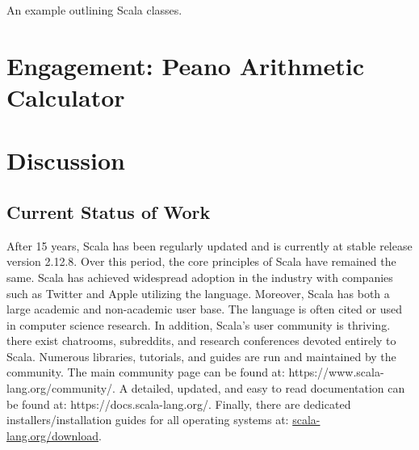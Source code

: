 \documentclass[jou,apacite]{IEEEtran}
\begin{document}

\begin{listing}
  \inputminted[frame=single]{Scala}{../examples/Nat.scala}
  \caption{An example outlining Scala classes.}
  \label{lst:nats-example}
\end{listing}

\section{Engagement: Peano Arithmetic Calculator}
\label{sec:engag-peano-arithm}

\section{Discussion}
\label{sec:discussion}

\subsection{Current Status of Work}
After 15 years, Scala has been regularly updated and is currently at stable
release version 2.12.8. Over this period, the core principles of Scala have
remained the same. Scala has achieved widespread adoption in the industry with
companies such as Twitter and Apple utilizing the language. Moreover, Scala has
both a large academic and non-academic user base. The language is often cited or
used in computer science research. In addition, Scala's user community is
thriving. there exist chatrooms, subreddits, and research conferences devoted
entirely to Scala. Numerous libraries, tutorials, and guides are run and
maintained by the community. The main community page can be found at:
https://www.scala-lang.org/community/. A detailed, updated, and easy to read
documentation can be found at: https://docs.scala-lang.org/. Finally, there are
dedicated installers/installation guides for all operating systems at:
\href{https://www.scala-lang.org/download/}{scala-lang.org/download}.




\end{document}
